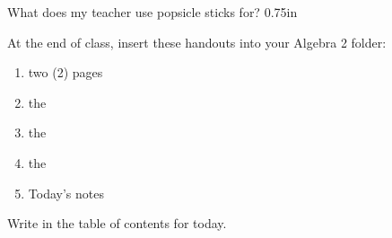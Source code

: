 {
    What does my teacher use popsicle sticks for?
}
{0.75in}

\vfill
\begin{tcolorbox}[center, width=5.25in]
    At the end of class, insert these handouts into your Algebra 2 folder:
    \vspace{-0.5\onelineskip}
    \begin{enumerate}[nosep]
        \item two (2)  pages 
        \item the 
        \item the 
        \item the 
        \item Today's  notes
    \end{enumerate}
    \vspace{0.5\onelineskip}
    Write  in the table of contents for today.
\end{tcolorbox}
\vfill